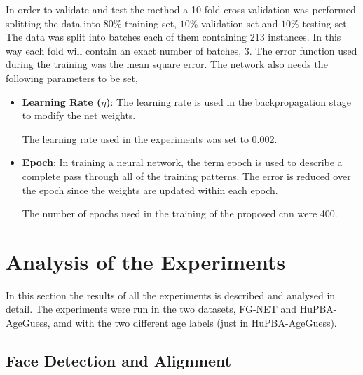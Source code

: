 In order to validate and test the method a 10-fold cross validation was performed splitting the data into $80\%$ training set, $10\%$ validation set and $10\%$ testing set. The data was split into batches each of them containing 213 instances. In this way each fold will contain an exact number of batches, 3. The error function used during the training was the mean square error. The network also needs the following parameters to be set,

\begin{itemize}
	\item \textbf{Learning Rate ($\eta $)}: The learning rate is used in the backpropagation stage to modify the net weights.
	
	The learning rate used in the experiments was set to 0.002. 
	
	\item \textbf{Epoch}: In training a neural network, the term epoch is used to describe a complete pass through all of the training patterns. The error is reduced over the epoch since the weights are updated within each epoch.
	
	The number of epochs used in the training of the proposed \gls{cnn} were 400.
\end{itemize}

\section{Analysis of the Experiments}







In this section the results of all the experiments is described and analysed in detail. The experiments were run in the two datasets, FG-NET and HuPBA-AgeGuess, amd with the two different age labels (just in HuPBA-AgeGuess).

\subsection{Face Detection and Alignment}

